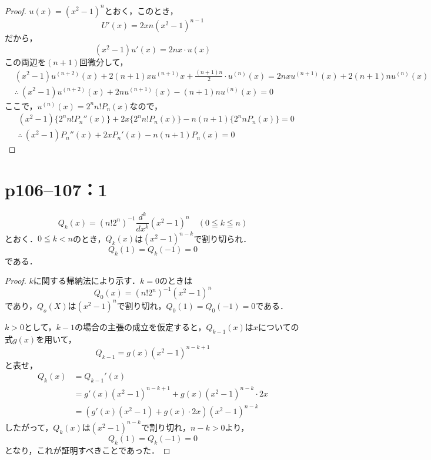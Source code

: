 \documentclass[a4paper,10pt,fleqn]{ltjsarticle}
\begin{document}
\begin{tleftbar}
    \begin{proof}
        $u(x)= (x^2-1)^n$とおく，このとき，
        \[
            U'(x)= 2x n(x^2-1)^{n-1}
        \]
        だから，
        \[
            (x^2-1) u'(x)=2nx \cdot u(x)
        \]
        この両辺を$(n+1)$回微分して，
        \begin{align*}
             & (x^2-1)u^{(n+2)}(x)+2(n+1)x u^{(n+1)} x + \frac{(n+1)n}{2} \cdot u^{(n)} (x) = 2nx u^{(n+1)}(x) + 2(n+1) n u^{(n)}(x) \\
             & \therefore ~(x^2-1)u^{(n+2)}(x) + 2n u^{(n+1)}(x)-(n+1)n u^{(n)}(x)=0
        \end{align*}
        ここで，$ u^{(n)} (x)= 2^n n! P_n (x)$なので，
        \begin{align*}
             & (x^2 -1) \{ 2^n n! P_n ''(x) \} +2x \{ 2^n n! P_n (x) \} -n(n+1) \{ 2^n n P_n(x) \} =0 \\
             & \therefore ~ (x^2-1) P_n ''(x)+2x P_n '(x) -n(n+1) P_n (x)=0
        \end{align*}
    \end{proof}
\end{tleftbar}

\newpage
\section*{p106--107：1}


\[
    Q_k (x)= (n! 2^n)^{-1} \frac{d^k}{dx^k} (x^2-1)^n \quad (0 \leqq k \leqq n)
\]
とおく．$0 \leqq k <n$のとき，$Q_k (x)$は$(x^2-1)^{n-k}$で割り切られ．
\[
    Q_k (1)= Q_k(-1)=0
\]
である．

\begin{proof}
    $k$に関する帰納法により示す．$k=0$のときは
    \[
        Q_0(x)= (n! 2^n)^{-1} (x^2-1)^n
    \]
    であり，$Q_o(X)$は$(x^2-1)^n$で割り切れ，$Q_0(1)=Q_0(-1)=0$である．

    $k>0$として，$k-1$の場合の主張の成立を仮定すると，$Q_{k-1}(x)$は$x$についての式$g(x)$を用いて，
    \[
        Q_{k-1} = g(x)(x^2-1)^{n-k+1}
    \]
    と表せ，
    \begin{align*}
        Q_k (x) & =Q_{k-1}' (x)                                        \\
                & = g'(x)(x^2-1)^{n-k+1} + g(x) (x^2-1)^{n-k} \cdot 2x \\
                & =(g'(x)(x^2-1)+g(x) \cdot 2x) (x^2-1)^{n-k}
    \end{align*}
    したがって，$Q_k(x)$は$(x^2-1)^{n-k}$で割り切れ，$n-k >0$より，
    \[
        Q_k (1)= Q_k(-1)=0
    \]
    となり，これが証明すべきことであった．
\end{proof}
\end{document}
